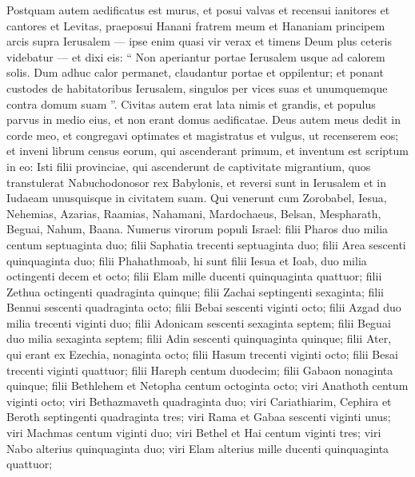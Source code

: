\begin{biblechapter}
\begin{biblechapter}
\begin{biblechapter}
\begin{biblechapter}
\begin{biblechapter}
\begin{biblechapter}
\begin{biblechapter}
\verse Postquam autem aedificatus est murus, et posui valvas et recensui ianitores et cantores et Levitas, 
\verse praeposui Hanani fratrem meum et Hananiam principem arcis supra Ierusalem — ipse enim quasi vir verax et timens Deum plus ceteris videbatur — 
\verse et dixi eis: “ Non aperiantur portae Ierusalem usque ad calorem solis. Dum adhuc calor permanet, claudantur portae et oppilentur; et ponant custodes de habitatoribus Ierusalem, singulos per vices suas et unumquemque contra domum suam ”.
 \verse Civitas autem erat lata nimis et grandis, et populus parvus in medio eius, et non erant domus aedificatae. 
\verse Deus autem meus dedit in corde meo, et congregavi optimates et magistratus et vulgus, ut recenserem eos; et inveni librum census eorum, qui ascenderant primum, et inventum est scriptum in eo:
 \verse Isti filii provinciae, qui ascenderunt de captivitate migrantium, quos transtulerat Nabuchodonosor rex Babylonis, et reversi sunt in Ierusalem et in Iudaeam unusquisque in civitatem suam. 
\verse Qui venerunt cum Zorobabel, Iesua, Nehemias, Azarias, Raamias, Nahamani, Mardochaeus, Belsan, Mespharath, Beguai, Nahum, Baana.
 Numerus virorum populi Israel: 
\verse filii Pharos duo milia centum septuaginta duo; 
\verse filii Saphatia trecenti septuaginta duo; 
\verse filii Area sescenti quinquaginta duo; 
\verse filii Phahathmoab, hi sunt filii Iesua et Ioab, duo milia octingenti decem et octo; 
\verse filii Elam mille ducenti quinquaginta quattuor; 
\verse filii Zethua octingenti quadraginta quinque; 
\verse filii Zachai septingenti sexaginta; 
\verse filii Bennui sescenti quadraginta octo; 
 \verse filii Bebai sescenti viginti octo; 
\verse filii Azgad duo milia trecenti viginti duo; 
\verse filii Adonicam sescenti sexaginta septem; 
\verse filii Beguai duo milia sexaginta septem; 
\verse filii Adin sescenti quinquaginta quinque; 
\verse filii Ater, qui erant ex Ezechia, nonaginta octo; 
\verse filii Hasum trecenti viginti octo; 
\verse filii Besai trecenti viginti quattuor; 
 \verse filii Hareph centum duodecim; 
\verse filii Gabaon nonaginta quinque; 
\verse filii Bethlehem et Netopha centum octoginta octo; 
\verse viri Anathoth centum viginti octo; 
\verse viri Bethazmaveth quadraginta duo; 
\verse viri Cariathiarim, Cephira et Beroth septingenti quadraginta tres; 
\verse viri Rama et Gabaa sescenti viginti unus; 
\verse viri Machmas centum viginti duo; 
\verse viri Bethel et Hai centum viginti tres; 
\verse viri Nabo alterius quinquaginta duo; 
\verse viri Elam alterius mille ducenti quinquaginta quattuor; 

\end{biblechapter}
\end{biblechapter}
\end{biblechapter}
\end{biblechapter}
\end{biblechapter}
\end{biblechapter}
\end{biblechapter}
